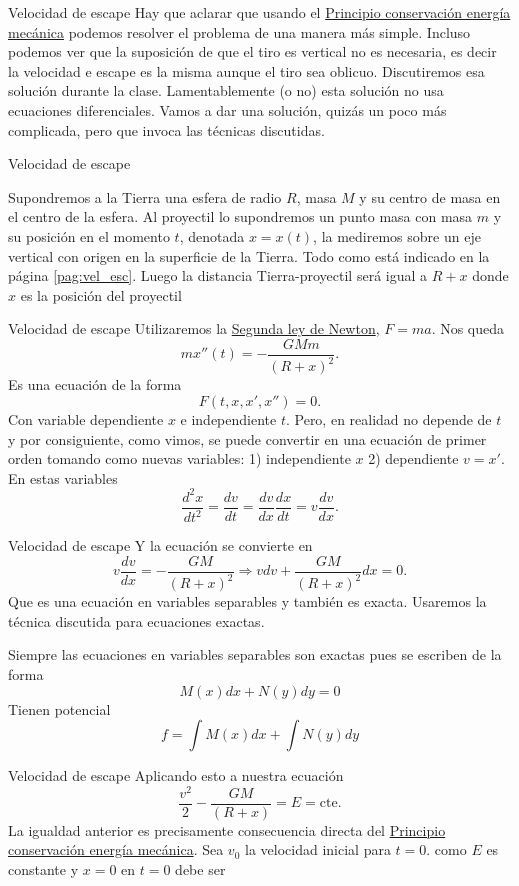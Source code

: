 \documentclass{article}
\begin{document}
{Velocidad de escape}
Hay que aclarar que usando el \href{https://docs.google.com/file/d/0B80iJ0HgObRRWll6MlJFSjFNMGc/edit}{Principio conservación energía mecánica} podemos resolver
el problema de una manera más simple. Incluso podemos ver que la suposición de que el tiro es vertical no es necesaria, es decir la velocidad e escape es la misma aunque
el tiro sea oblicuo. Discutiremos esa solución durante la clase. Lamentablemente (o no)  esta solución no usa ecuaciones diferenciales.
Vamos a dar una solución, quizás un poco más complicada, pero que invoca las técnicas 
discutidas.

 



{Velocidad de escape}
 

Supondremos a la Tierra una esfera de radio $R$, masa $M$ y su centro de masa en el centro de la esfera.   Al proyectil lo supondremos un punto masa 
con masa $m$ y su posición en el momento $t$, denotada $x=x(t)$, la mediremos sobre un eje vertical con origen en la superficie de la Tierra.  Todo como está indicado en la página \ref{pag:vel_esc}. 
Luego la distancia Tierra-proyectil será igual a $R+x$ donde $x$ es la posición del proyectil




{Velocidad de escape}
Utilizaremos la \href{http://es.wikipedia.org/wiki/Leyes_de_Newton\#Segunda_ley_de_Newton_o_ley_de_fuerza}{Segunda ley de Newton}, $F=ma$. Nos queda
\[mx''(t)=-\frac{GMm}{(R+x)^2}.\]
Es una ecuación de la forma
\[F(t,x,x',x'')=0.\]
Con variable dependiente $x$ e independiente $t$. Pero, en realidad no depende de $t$ y por consiguiente, como vimos, se puede convertir en una ecuación de primer orden
tomando como nuevas variables: 1) independiente $x$ 2) dependiente $v=x'$. En estas variables
\[\frac{d^2x}{dt^2}=\frac{dv}{dt}=\frac{dv}{dx}\frac{dx}{dt}=v\frac{dv}{dx}.\]




{Velocidad de escape}
Y la ecuación se convierte en
\[v\frac{dv}{dx}=-\frac{GM}{(R+x)^2}\Longrightarrow vdv+\frac{GM}{(R+x)^2}dx=0.\]
Que es una ecuación en variables separables y también es exacta. Usaremos la técnica discutida para 
ecuaciones exactas. 

Siempre las ecuaciones en variables separables son exactas pues se escriben de la forma
\[M(x)dx+N(y)dy=0\]
Tienen potencial
\[f=\int M(x)dx +\int N(y)dy\]




{Velocidad de escape}
Aplicando esto a nuestra ecuación
\begin{equation}\label{energia}
 \frac{v^2}{2}-\frac{GM}{(R+x)}=E=\text{cte}.
\end{equation}
  La igualdad anterior es precisamente 
 consecuencia directa del \href{https://docs.google.com/file/d/0B80iJ0HgObRRWll6MlJFSjFNMGc/edit}{Principio conservación energía mecánica}.
Sea $v_0$ la velocidad inicial para $t=0$. como $E$ es constante y $x=0$ en $t=0$ debe ser 
\end{document}
